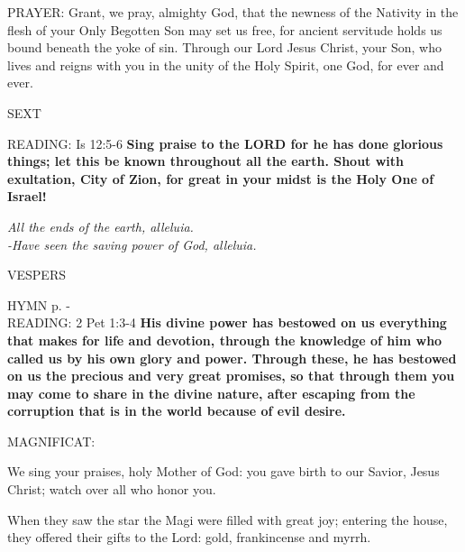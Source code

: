 \noindent\small{\uppercase{PRAYER:}}	Grant, we pray, almighty God, that the newness of the Nativity in the flesh of your Only Begotten Son may set us free, for ancient servitude holds us bound beneath the yoke of sin. Through our Lord Jesus Christ, your Son, who lives and reigns with you in the unity of the Holy Spirit, one God, for ever and ever.

\begin{flushleft}\normalsize{\uppercase{SEXT\\}}\end{flushleft}
\noindent\small{\uppercase{READING:}}    Is 12:5-6 \textbf{    Sing praise to the LORD for he has done glorious things; let this be known throughout all the earth. Shout with exultation, City of Zion, for great in your midst is the Holy One of Israel!}
\begin{center}\textit{All the ends of the earth, alleluia.\\
-Have seen the saving power of God, alleluia.}\end{center}

\begin{flushleft}\normalsize{\uppercase{VESPERS\\}}\end{flushleft}
\small{\uppercase{HYMN} p. \pageref{christmas:firstHymn}-\pageref{christmas:lastHymn}\\}
\noindent\small{\uppercase{READING:}}    2 Pet 1:3-4 \textbf{    His divine power has bestowed on us everything that makes for life and devotion, through the knowledge of him who called us by his own glory and power. Through these, he has bestowed on us the precious and very great promises, so that through them you may come to share in the divine nature, after escaping from the corruption that is in the world because of evil desire.\\}

\noindent\small{\uppercase{MAGNIFICAT:}} \begin{description}[labelindent=\parindent, leftmargin=*]
\item [(before the Epiphany)] We sing your praises, holy Mother of God: you gave birth to our Savior, Jesus Christ; watch over all who honor you.
\item [(Monday after the Epiphany)] When they saw the star the Magi were filled with great joy; entering the house, they offered their gifts to the Lord: gold, frankincense and myrrh.\\
\end{description}

